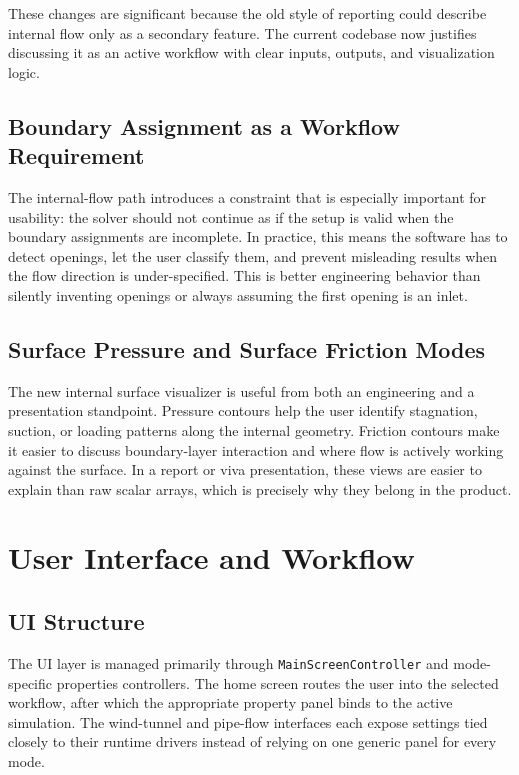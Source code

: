 \documentclass[12pt,a4paper,titlepage]{report}
\begin{document}
These changes are significant because the old style of reporting could describe internal flow only as a secondary feature. The current codebase now justifies discussing it as an active workflow with clear inputs, outputs, and visualization logic.

\section{Boundary Assignment as a Workflow Requirement}
The internal-flow path introduces a constraint that is especially important for usability: the solver should not continue as if the setup is valid when the boundary assignments are incomplete. In practice, this means the software has to detect openings, let the user classify them, and prevent misleading results when the flow direction is under-specified. This is better engineering behavior than silently inventing openings or always assuming the first opening is an inlet.

\section{Surface Pressure and Surface Friction Modes}
The new internal surface visualizer is useful from both an engineering and a presentation standpoint. Pressure contours help the user identify stagnation, suction, or loading patterns along the internal geometry. Friction contours make it easier to discuss boundary-layer interaction and where flow is actively working against the surface. In a report or viva presentation, these views are easier to explain than raw scalar arrays, which is precisely why they belong in the product.

\chapter{User Interface and Workflow}
\section{UI Structure}
The UI layer is managed primarily through \texttt{MainScreenController} and mode-specific properties controllers. The home screen routes the user into the selected workflow, after which the appropriate property panel binds to the active simulation. The wind-tunnel and pipe-flow interfaces each expose settings tied closely to their runtime drivers instead of relying on one generic panel for every mode.
\end{document}
